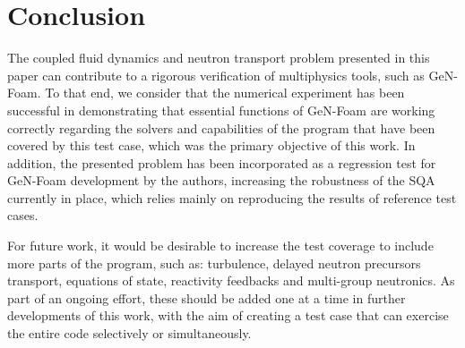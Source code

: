 
\section{Conclusion}

The coupled fluid dynamics and neutron transport problem presented in this paper can contribute to a rigorous verification of multiphysics tools, such as GeN-Foam.
To that end, we consider that the numerical experiment has been successful in demonstrating that essential functions of GeN-Foam are working correctly regarding the solvers and capabilities of the program that have been covered by this test case, which was the primary objective of this work.
In addition, the presented problem has been incorporated as a regression test for GeN-Foam development by the authors, increasing the robustness of the SQA currently in place, which relies mainly on reproducing the results of reference test cases.

For future work, it would be desirable to increase the test coverage to include more parts of the program, such as: turbulence, delayed neutron precursors transport, equations of state, reactivity feedbacks and multi-group neutronics.
As part of an ongoing effort, these should be added one at a time in further developments of this work, with the aim of creating a test case that can exercise the entire code selectively or simultaneously.
